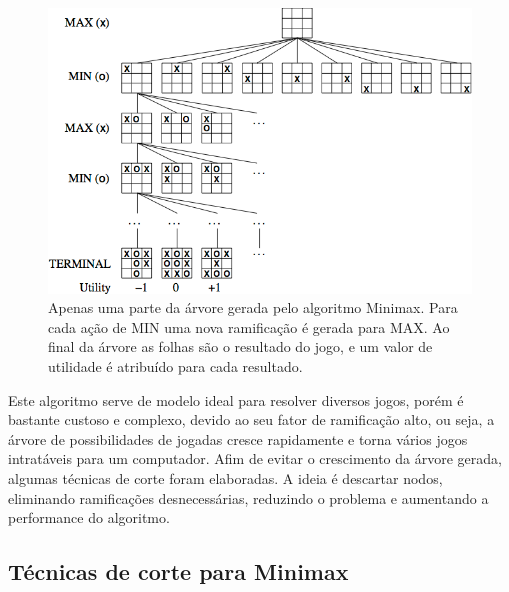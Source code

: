     \begin{figure}[H]
      \centering
      \includegraphics[width=1\textwidth]{minimax-fig1.PNG}
      \caption{Apenas uma parte da árvore gerada pelo algoritmo Minimax. Para cada ação de MIN uma nova ramificação é gerada para MAX. Ao final da árvore as folhas são o resultado do jogo, e um valor de utilidade é atribuído para cada resultado.~\cite[Cap 5, pp163-166]{AIMA}}
    \end{figure}
     
 
 
Este algoritmo serve de modelo ideal para resolver diversos jogos, porém é bastante custoso e complexo, devido ao seu fator de ramificação alto, ou seja, a árvore de possibilidades de jogadas cresce rapidamente e torna vários jogos intratáveis para um computador. Afim de evitar o crescimento da árvore gerada, algumas técnicas de corte foram elaboradas. A ideia é descartar nodos, eliminando ramificações desnecessárias, reduzindo o problema e aumentando a performance do algoritmo.
 

\subsection{\label{sec:secao3.2}Técnicas de corte para Minimax}

